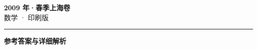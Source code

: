 \documentclass[zihao=5, a4paper]{ctexart}
\begin{document}
\begin{center}
  {\Large\bfseries 2009 年·春季上海卷}\\[4pt]
  {\large 数学 · 印刷版}
\end{center}
\medskip
{}

\par\bigskip\hrule\bigskip
{}
\begin{center}{\large\bfseries 参考答案与详细解析}\end{center}
\smallskip

\end{document}
